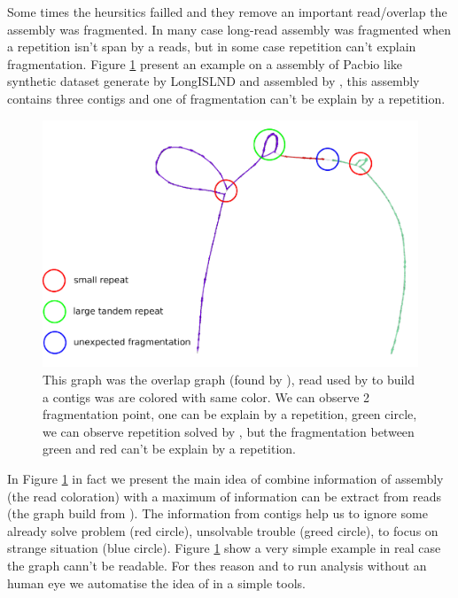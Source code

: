 \documentclass[main.tex]{subfiles}
\begin{document}
Some times the heursitics failled and they remove an important read/overlap the assembly was fragmented. In many case long-read assembly was fragmented when a repetition isn't span by a reads, but in some case repetition can't explain fragmentation. Figure \ref{postassembly:fig:t_roseus_example} present an example on a assembly of Pacbio like synthetic dataset generate by LongISLND\cite{longislnd} and assembled by \canu, this assembly contains three contigs and one of fragmentation can't be explain by a repetition.

\begin{figure}[ht]
    \includegraphics[width=\textwidth]{postassembly/images/t_roseus_projection_annoted.pdf}
    \caption{This graph was the overlap graph (found by \minimap), read used by \canu to build a contigs was are colored with same color. We can observe 2 fragmentation point, one can be explain by a repetition, green circle, we can observe repetition solved by \canu, but the fragmentation between green and red can't be explain by a repetition.}
    \label{postassembly:fig:t_roseus_example}
\end{figure}

In Figure \ref{postassembly:fig:t_roseus_example} in fact we present the main idea of \knot combine information of assembly (the read coloration) with a maximum of information can be extract from reads (the \OLC graph build from \minimap). The information from contigs help us to ignore some already solve problem (red circle), unsolvable trouble (greed circle), to focus on strange situation (blue circle). Figure \ref{postassembly:fig:t_roseus_example} show a very simple example in real case the \OLC graph cann't be readable. For thes reason and to run analysis without an human eye we automatise the idea of \knot in a simple tools.
\end{document}
